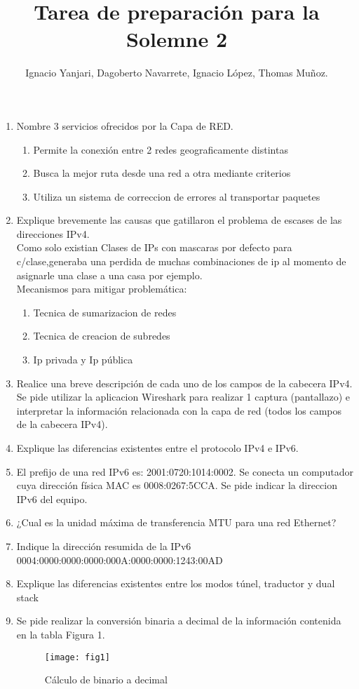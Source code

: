\documentclass{udparticle}
\title{Tarea de preparación para la Solemne 2}
\author{Ignacio Yanjari, Dagoberto Navarrete, Ignacio López, Thomas Muñoz.}
\begin{document}
\maketitle
\begin{enumerate}
\item Nombre 3 servicios ofrecidos por la Capa de RED.

\begin{enumerate}
	\item Permite la conexión entre 2 redes geograficamente distintas
	\item Busca la mejor ruta desde una red a otra mediante criterios
	\item Utiliza un sistema de correccion de errores al transportar paquetes
\end{enumerate}

\item Explique brevemente las causas que gatillaron el problema de escases de las direcciones IPv4.\\
Como solo existian Clases de IPs con mascaras por defecto para c/clase,generaba una 
perdida de muchas combinaciones de ip al momento de asignarle una clase a una casa por 
ejemplo.\\
Mecanismos para mitigar problemática:

\begin{enumerate}
	\item Tecnica de sumarizacion de redes 
	\item Tecnica de  creacion de subredes
	\item Ip privada y Ip pública
\end{enumerate}

\item Realice una breve descripción de cada uno de los campos de la cabecera IPv4. Se pide utilizar la aplicacion Wireshark para realizar 1 captura (pantallazo) e interpretar la información relacionada con la capa de red (todos los campos de la cabecera IPv4).
\item Explique las diferencias existentes entre el protocolo IPv4 e IPv6.
\item El prefijo de una red IPv6 es: 2001:0720:1014:0002. Se conecta un
computador cuya dirección física MAC es 0008:0267:5CCA. Se pide indicar la direccion IPv6 del equipo.
\item ¿Cual es la unidad máxima de transferencia MTU para una red Ethernet?
\item Indique la dirección resumida de la IPv6 0004:0000:0000:0000:000A:0000:0000:1243:00AD
\item Explique las diferencias existentes entre los modos túnel, traductor y dual stack
\item Se pide realizar la conversión binaria a decimal de la información contenida en la tabla Figura 1.
	\begin{figure}[H]
	\centering
	\texttt{[image: fig1]}
	\caption{Cálculo de binario a decimal}
	\end{figure}
\clearpage


\end{enumerate}
\end{document}
